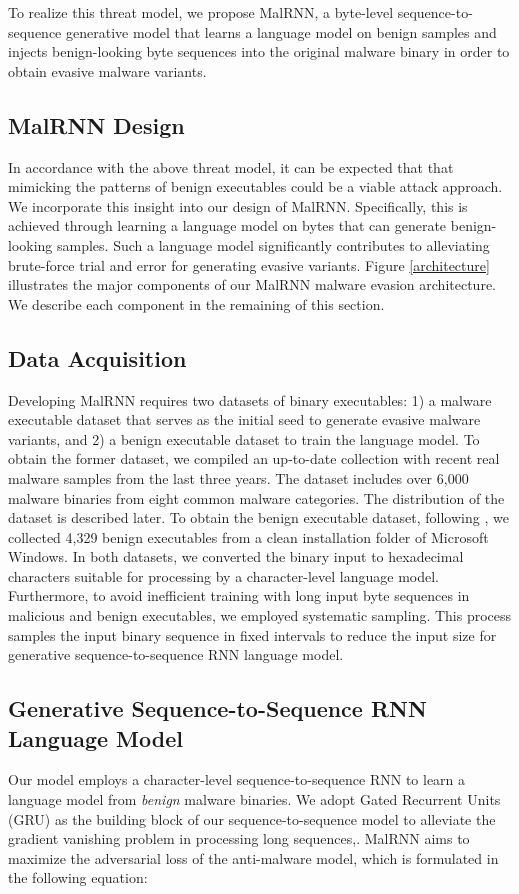 \documentclass[letterpaper]{article}
\newcommand{\malrnn}{M\lowercase{a}lRNN }
\begin{document}
To realize this threat model, we propose MalRNN, a byte-level sequence-to-sequence generative model that learns a language model on benign samples and injects benign-looking byte sequences into the original malware binary in order to obtain evasive malware variants.

\subsection{\malrnn Design}
\label{designing_malrnn}



In accordance with the above threat model, it can be expected that that mimicking the patterns of benign executables could be a viable attack approach. We incorporate this insight into our design of MalRNN. Specifically, this is achieved through learning a language model on bytes that can generate benign-looking samples. Such a language model significantly contributes to alleviating brute-force trial and error for generating evasive variants. Figure \ref{architecture} illustrates the major components of our MalRNN malware evasion architecture. We describe each component in the remaining of this section.

\subsection{Data Acquisition}
Developing \malrnn requires two datasets of binary executables: 1) a malware executable dataset that serves as the initial seed to generate evasive malware variants, and 2) a benign executable dataset to train the language model. To obtain the former dataset, we compiled an up-to-date collection with recent real malware samples from the last three years. The dataset includes over 6,000 malware binaries from eight common malware categories. The distribution of the dataset is described later. To obtain the benign executable dataset, following \cite{raff2018malware}, we collected 4,329 benign executables from a clean installation folder of Microsoft Windows. In both datasets, we converted the binary input to hexadecimal characters suitable for processing by a character-level language model. Furthermore, to avoid inefficient training with long input byte sequences in malicious and benign executables, we employed systematic sampling. This process samples the input binary sequence in fixed intervals to reduce the input size for generative sequence-to-sequence RNN language model.

\subsection{Generative Sequence-to-Sequence RNN Language Model}
Our model employs a character-level sequence-to-sequence RNN to learn a language model from \emph{benign} malware binaries. We adopt Gated Recurrent Units (GRU) \cite{goldberg_neural_2017} as the building block of our sequence-to-sequence model to alleviate the gradient vanishing problem in processing long sequences,\cite{dey2017gate}. \malrnn aims to maximize the adversarial loss \cite{madry2017towards} of the anti-malware model, which is formulated in the following equation:
\end{document}
